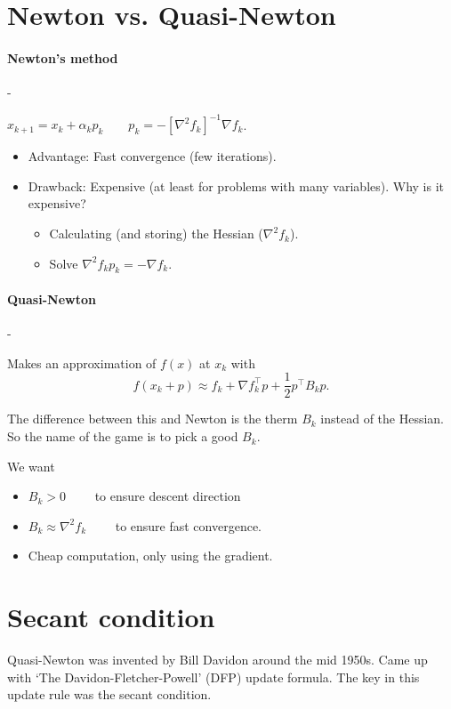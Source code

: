 \documentclass{article}
\begin{document}
\section{Newton vs. Quasi-Newton}

\paragraph{Newton's method}- 

\medskip $x_{k+1} = x_k + \alpha_k p_k \qquad p_k = -[\nabla ^2 f_k]^{-1} \nabla f_k$.
\begin{itemize}
  \item Advantage: Fast convergence (few iterations). 
  \item Drawback: Expensive (at least for problems with many variables). Why is it expensive?  
  \begin{itemize}
    \item Calculating (and storing) the Hessian ($\nabla ^2 f_k$).
    \item Solve $\nabla ^2 f_k p_k = - \nabla f_k$. 
  \end{itemize}
\end{itemize}

\paragraph{Quasi-Newton}- 

\medskip Makes an approximation of $f(x)$ at $x_k$ with
\[
  f(x_k + p) \approx f_k + \nabla f_k^{\top}p + \frac{1}{2}p^{\top}B_k p 
.\] 

The difference between this and Newton is the therm $B_k$ instead of the Hessian. So the name of the game is to pick a 
good $B_k$. 


\medskip We want 
\begin{itemize}
  \item $B_k > 0 \qquad$ to ensure descent direction
  \item $B_k \approx \nabla ^2 f_k \qquad$ to ensure fast convergence. 
  \item Cheap computation, only using the gradient. 
\end{itemize}

\section{Secant condition}


Quasi-Newton was invented by Bill Davidon around the mid 1950s. Came up with `The Davidon-Fletcher-Powell' (DFP) update formula.
The key in this update rule was the secant condition. 
\end{document}

